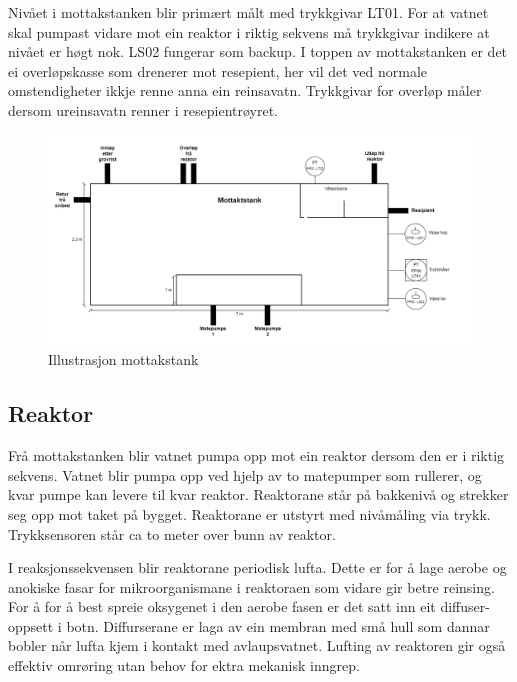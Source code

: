 Nivået i mottakstanken blir primært målt med trykkgivar LT01. For at vatnet skal pumpast vidare mot ein
reaktor i riktig sekvens må trykkgivar indikere at nivået er høgt nok. LS02 fungerar som backup.
I toppen av mottakstanken er det ei overløpskasse som drenerer mot resepient, her vil det
ved normale omstendigheter ikkje renne anna ein reinsavatn. Trykkgivar for overløp måler
dersom ureinsavatn renner i resepientrøyret.


\begin{figure}[htbp]
    \centering
    \includegraphics[width=1\textwidth]{Figurar/Mottakstank.png}
    \caption{Illustrasjon mottakstank}\label{fig:HMI}
\end{figure}

\newpage
\subsection{Reaktor}

Frå mottakstanken blir vatnet pumpa opp mot ein reaktor dersom den er i riktig sekvens.
Vatnet blir pumpa opp ved hjelp av to matepumper som rullerer, og kvar pumpe kan
levere til kvar reaktor. 
Reaktorane står på bakkenivå og strekker seg opp mot taket på bygget.
Reaktorane er utstyrt med nivåmåling via trykk. Trykksensoren står ca to meter over bunn av reaktor.

I reaksjonssekvensen blir reaktorane periodisk lufta. Dette er for å lage aerobe og anokiske fasar
for mikroorganismane i reaktoraen som vidare gir betre reinsing.
For å for å best spreie oksygenet i den aerobe fasen
er det satt inn eit diffuser-oppsett i botn.
Diffurserane er laga av ein membran med små hull som dannar bobler når lufta kjem i 
kontakt med avlaupsvatnet.
Lufting av reaktoren gir også effektiv omrøring utan behov for ektra mekanisk inngrep.

